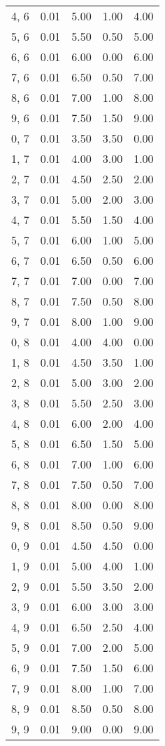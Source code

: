 \documentclass[12pt]{article}
\begin{document}
\begin{tabular}{c || c || c | c | c}
4, 6 & 0.01 & 5.00 & 1.00 & 4.00 \\
5, 6 & 0.01 & 5.50 & 0.50 & 5.00 \\
6, 6 & 0.01 & 6.00 & 0.00 & 6.00 \\
7, 6 & 0.01 & 6.50 & 0.50 & 7.00 \\
8, 6 & 0.01 & 7.00 & 1.00 & 8.00 \\
9, 6 & 0.01 & 7.50 & 1.50 & 9.00 \\
0, 7 & 0.01 & 3.50 & 3.50 & 0.00 \\
1, 7 & 0.01 & 4.00 & 3.00 & 1.00 \\
2, 7 & 0.01 & 4.50 & 2.50 & 2.00 \\
3, 7 & 0.01 & 5.00 & 2.00 & 3.00 \\
4, 7 & 0.01 & 5.50 & 1.50 & 4.00 \\
5, 7 & 0.01 & 6.00 & 1.00 & 5.00 \\
6, 7 & 0.01 & 6.50 & 0.50 & 6.00 \\
7, 7 & 0.01 & 7.00 & 0.00 & 7.00 \\
8, 7 & 0.01 & 7.50 & 0.50 & 8.00 \\
9, 7 & 0.01 & 8.00 & 1.00 & 9.00 \\
0, 8 & 0.01 & 4.00 & 4.00 & 0.00 \\
1, 8 & 0.01 & 4.50 & 3.50 & 1.00 \\
2, 8 & 0.01 & 5.00 & 3.00 & 2.00 \\
3, 8 & 0.01 & 5.50 & 2.50 & 3.00 \\
4, 8 & 0.01 & 6.00 & 2.00 & 4.00 \\
5, 8 & 0.01 & 6.50 & 1.50 & 5.00 \\
6, 8 & 0.01 & 7.00 & 1.00 & 6.00 \\
7, 8 & 0.01 & 7.50 & 0.50 & 7.00 \\
8, 8 & 0.01 & 8.00 & 0.00 & 8.00 \\
9, 8 & 0.01 & 8.50 & 0.50 & 9.00 \\
0, 9 & 0.01 & 4.50 & 4.50 & 0.00 \\
1, 9 & 0.01 & 5.00 & 4.00 & 1.00 \\
2, 9 & 0.01 & 5.50 & 3.50 & 2.00 \\
3, 9 & 0.01 & 6.00 & 3.00 & 3.00 \\
4, 9 & 0.01 & 6.50 & 2.50 & 4.00 \\
5, 9 & 0.01 & 7.00 & 2.00 & 5.00 \\
6, 9 & 0.01 & 7.50 & 1.50 & 6.00 \\
7, 9 & 0.01 & 8.00 & 1.00 & 7.00 \\
8, 9 & 0.01 & 8.50 & 0.50 & 8.00 \\
9, 9 & 0.01 & 9.00 & 0.00 & 9.00 \\
\end{tabular}
\end{document}
